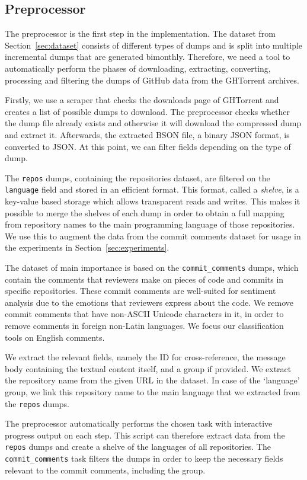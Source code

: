 \documentclass{article}
\begin{document}
\subsection{Preprocessor}\label{sec:preprocessor}
The preprocessor is the first step in the implementation. The dataset from 
Section~\ref{sec:dataset} consists of different types of dumps and is split 
into multiple incremental dumps that are generated bimonthly. Therefore, we 
need a tool to automatically perform the phases of downloading, extracting, 
converting, processing and filtering the dumps of GitHub data from the 
GHTorrent archives.

Firstly, we use a scraper that checks the downloads page of GHTorrent and 
creates a list of possible dumps to download. The preprocessor checks whether 
the dump file already exists and otherwise it will download the compressed dump 
and extract it. Afterwards, the extracted BSON file, a binary JSON format, is 
converted to JSON\@. At this point, we can filter fields depending on the type
of dump.

The {\tt repos} dumps, containing the repositories dataset, are filtered on the 
{\tt language} field and stored in an efficient format. This format, called a
\emph{shelve}, is a key-value based storage which allows transparent reads and 
writes. This makes it possible to merge the shelves of each dump in order to 
obtain a full mapping from repository names to the main programming language of 
those repositories. We use this to augment the data from the commit comments
dataset for usage in the experiments in Section~\ref{sec:experiments}.

The dataset of main importance is based on the {\tt commit\_comments} dumps, 
which contain the comments that reviewers make on pieces of code and commits in 
specific repositories. These commit comments are well-suited for sentiment 
analysis due to the emotions that reviewers express about the code. We remove
commit comments that have non-ASCII Unicode characters in it, in order to
remove comments in foreign non-Latin languages. We focus our classification
tools on English comments.

We extract the relevant fields, namely the ID for cross-reference, the message 
body containing the textual content itself, and a group if provided. We extract 
the repository name from the given URL in the dataset. In case of the 
`language' group, we link this repository name to the main language that we 
extracted from the {\tt repos} dumps.

The preprocessor automatically performs the chosen task with interactive 
progress output on each step. This script can therefore extract data from the
{\tt repos} dumps and create a shelve of the languages of all repositories. The
{\tt commit\_comments} task filters the dumps in order to keep the necessary
fields relevant to the commit comments, including the group.
\end{document}
